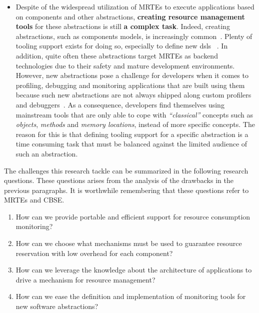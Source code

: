\begin{itemize}
\item Despite of the widespread utilization of MRTEs to execute applications based on components and other abstractions, \textbf{creating resource management tools} for these abstractions is still \textbf{a complex task}.
Indeed, creating abstractions, such as components models, is increasingly common~\cite{van2000domain,hutchinson2011empirical,whittle2014state}.
Plenty of tooling support exists for doing so, especially to define new \glspl{dsl} ~\cite{van2000domain,Fowler:2010:DSL:1809745,raey,Merkle:2010:TMT:1869542.1869564,Eysholdt:2010:XIY:1869542.1869625}.
In addition, quite often these abstractions target MRTEs as backend technologies due to their safety and mature development environments.
However, new abstractions pose a challenge for developers when it comes to profiling, debugging and monitoring applications that are built using them because such new abstractions are not always shipped along custom profilers and debuggers~\cite{Kolomvatsos:2012:DAC:2148250.2148478,Wu:2008:GGD:1394966.1394970,Mannadiar:2010:DDM:1964571.1964595,Lindeman:2011:DDD:2047862.2047885,Wu:2005:TDL:1094855.1094920,Faith1998}.
As a consequence, developers find themselves using mainstream tools that are only able to cope with \textit{``classical''} concepts such as \textit{objects}, \textit{methods} and \textit{memory locations}, instead of more specific concepts.
The reason for this is that defining tooling support for a specific abstraction is a time consuming task that must be balanced against the limited audience of such an abstraction.
\end{itemize}
 
The challenges this research tackle can be summarized in the following research questions.
These questions arises from the analysis of the drawbacks in the previous paragraphs.
It is worthwhile remembering that these questions refer to MRTEs and CBSE.

\begin{enumerate}
\renewcommand{\theenumi}{\textit{RQ\arabic{enumi}}}

\item How can we provide portable and efficient support for resource consumption monitoring? \label{rq:rq1}

\item How can we choose what mechanisms must be used to guarantee resource reservation with low overhead for each component? \label{rq:rq2}

\item How can we leverage the knowledge about the architecture of applications to drive a mechanism for resource management? \label{rq:rq3}

\item How can we ease the definition and implementation of monitoring tools for new software abstractions? \label{rq:rq4}
\end{enumerate}
 
